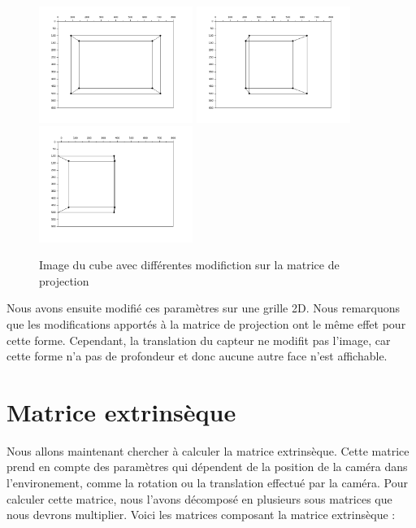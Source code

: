 \documentclass[a4paper,11pt]{article}
\begin{document}
  \begin{figure}[H]
    \center
    \includegraphics[width=5cm]{ProjectionTaille.png}
    \includegraphics[width=5cm]{ProjectionRotation.png}
    \includegraphics[width=5cm]{ProjectionTranslation.png}
    \caption{Image du cube avec différentes modifiction sur la matrice de projection}
  \end{figure}
  
  Nous avons ensuite modifié ces paramètres sur une grille 2D. Nous remarquons que 
  les modifications apportés à la matrice de projection ont le même effet pour cette forme. 
  Cependant, la translation du capteur ne modifit pas l'image, car cette forme n'a pas de profondeur
  et donc aucune autre face n'est affichable.
  
  \section{Matrice extrinsèque}
  
  Nous allons maintenant chercher à calculer la matrice extrinsèque. Cette matrice prend en compte
  des paramètres qui dépendent de la position de la caméra dans l'environement, comme la rotation 
  ou la translation effectué par la caméra. Pour calculer cette matrice, nous l'avons décomposé en 
  plusieurs sous matrices que nous devrons multiplier. Voici les matrices composant la matrice extrinsèque :\\
  
\end{document}

